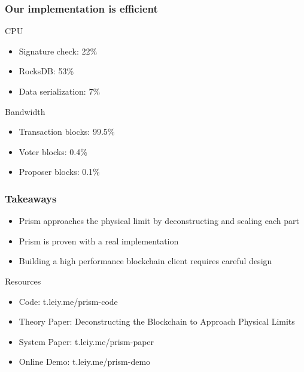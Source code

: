 \documentclass[aspectratio=169]{beamer}
\begin{document}
\begin{frame}
    \frametitle{Our implementation is efficient}
    \begin{block}{CPU}
    \begin{itemize}
        \item Signature check: 22\%
        \item RocksDB: 53\%
        \item Data serialization: 7\%
    \end{itemize}
    \end{block}
    \begin{block}{Bandwidth}
    \begin{itemize}
        \item Transaction blocks: 99.5\%
        \item Voter blocks: 0.4\%
        \item Proposer blocks: 0.1\%
    \end{itemize}
    \end{block}
\end{frame}

\begin{frame}
    \frametitle{Takeaways}
    \begin{block}{}
    \begin{itemize}
        \item Prism approaches the physical limit by deconstructing and scaling each part
        \item Prism is proven with a real implementation
        \item Building a high performance blockchain client requires careful design
    \end{itemize}
    \end{block}
    \begin{block}{Resources}
    \begin{itemize}
        \item Code: t.leiy.me/prism-code
        \item Theory Paper: Deconstructing the Blockchain to Approach Physical Limits
        \item System Paper: t.leiy.me/prism-paper
        \item Online Demo: t.leiy.me/prism-demo
    \end{itemize}
    \end{block}
\end{frame}
\end{document}
